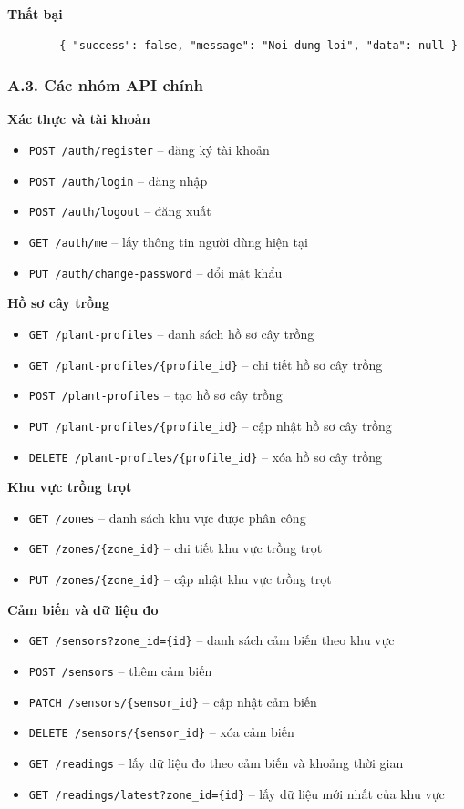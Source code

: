 \documentclass[13pt,a4paper]{extarticle}
\numberwithin{figure}{section}
\numberwithin{table}{section}
\begin{document}
	\noindent
	\textbf{Thất bại}
	
	\noindent
	\begin{lstlisting}
		{ "success": false, "message": "Noi dung loi", "data": null }
	\end{lstlisting}
	
	\subsubsection*{A.3. Các nhóm API chính}
	
	\noindent
	\textbf{Xác thực và tài khoản}
	\begin{itemize}
		\item \texttt{POST /auth/register} -- đăng ký tài khoản
		\item \texttt{POST /auth/login} -- đăng nhập
		\item \texttt{POST /auth/logout} -- đăng xuất
		\item \texttt{GET /auth/me} -- lấy thông tin người dùng hiện tại
		\item \texttt{PUT /auth/change-password} -- đổi mật khẩu
	\end{itemize}
	
	\noindent
	\textbf{Hồ sơ cây trồng}
	\begin{itemize}
		\item \texttt{GET /plant-profiles} -- danh sách hồ sơ cây trồng
		\item \texttt{GET /plant-profiles/\{profile\_id\}} -- chi tiết hồ sơ cây trồng
		\item \texttt{POST /plant-profiles} -- tạo hồ sơ cây trồng
		\item \texttt{PUT /plant-profiles/\{profile\_id\}} -- cập nhật hồ sơ cây trồng
		\item \texttt{DELETE /plant-profiles/\{profile\_id\}} -- xóa hồ sơ cây trồng
	\end{itemize}
	
	\noindent
	\textbf{Khu vực trồng trọt}
	\begin{itemize}
		\item \texttt{GET /zones} -- danh sách khu vực được phân công
		\item \texttt{GET /zones/\{zone\_id\}} -- chi tiết khu vực trồng trọt
		\item \texttt{PUT /zones/\{zone\_id\}} -- cập nhật khu vực trồng trọt
	\end{itemize}
	
	\noindent
	\textbf{Cảm biến và dữ liệu đo}
	\begin{itemize}
		\item \texttt{GET /sensors?zone\_id=\{id\}} -- danh sách cảm biến theo khu vực
		\item \texttt{POST /sensors} -- thêm cảm biến
		\item \texttt{PATCH /sensors/\{sensor\_id\}} -- cập nhật cảm biến
		\item \texttt{DELETE /sensors/\{sensor\_id\}} -- xóa cảm biến
		\item \texttt{GET /readings} -- lấy dữ liệu đo theo cảm biến và khoảng thời gian
		\item \texttt{GET /readings/latest?zone\_id=\{id\}} -- lấy dữ liệu mới nhất của khu vực
	\end{itemize}
	
\end{document}
